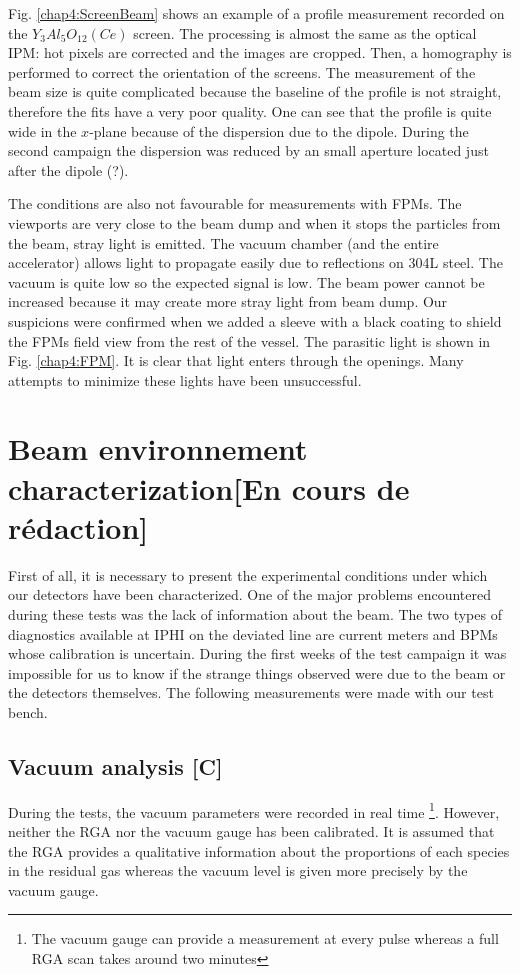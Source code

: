 \begin{refsection}
  Fig. \ref{chap4:ScreenBeam} shows an example of a profile measurement recorded on the $Y_{3}Al_{5}O_{12}(Ce)$ screen. The processing is almost the same as the optical IPM: hot pixels are corrected and the images are cropped. Then, a homography is performed to correct the orientation of the screens. The measurement of the beam size is quite complicated because the baseline of the profile is not straight, therefore the fits have a very poor quality. One can see that the profile is quite wide in the $x$-plane because of the dispersion due to the dipole. During the second campaign the dispersion was reduced by an small aperture located just after the dipole (?).

  The conditions are also not favourable for measurements with FPMs. The viewports are very close to the beam dump and when it stops the particles from the beam, stray light is emitted. The vacuum chamber (and the entire accelerator) allows light to propagate easily due to reflections on 304L steel. The vacuum is quite low so the expected signal is low. The beam power cannot be increased because it may create more stray light from beam dump. Our suspicions were confirmed when we added a sleeve with a black coating to shield the FPMs field view from the rest of the vessel. The parasitic light is shown in Fig. \ref{chap4:FPM}. It is clear that light enters through the openings. Many attempts to minimize these lights have been unsuccessful.

  

  \section{Beam environnement characterization[En cours de rédaction]}
  First of all, it is necessary to present the experimental conditions under which our detectors have been characterized. One of the major problems encountered during these tests was the lack of information about the beam. The two types of diagnostics available at IPHI on the deviated line are current meters and BPMs whose calibration is uncertain. During the first weeks of the test campaign it was impossible for us to know if the strange things observed were due to the beam or the detectors themselves. The following measurements were made with our test bench.

  \subsection{Vacuum analysis [C]}
  \label{sec4:vacuum}
  During the tests, the vacuum parameters were recorded in real time \footnote{The vacuum gauge can provide a measurement at every pulse whereas a full RGA scan takes around two minutes}. However, neither the RGA nor the vacuum gauge has been calibrated. It is assumed that the RGA provides a qualitative information about the proportions of each species in the residual gas whereas the vacuum level is given more precisely by the vacuum gauge.


\end{refsection}
